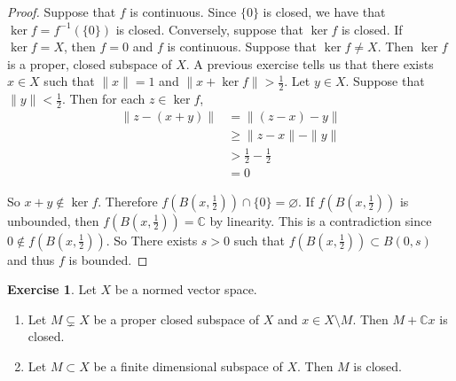\documentclass[12pt]{amsart}
\theoremstyle{definition}
\newtheorem{ex}[definition]{Exercise}
\newcommand{\C}{\mathbb{C}}
\begin{document}
	\begin{proof}
		Suppose that $f$ is continuous. Since $\{0\}$ is closed, we have that $\ker f = f^{-1}(\{0\})$ is closed. Conversely, suppose that $\ker f$ is closed. If $\ker f = X$, then $f =0$ and $f$ is continuous. Suppose that $\ker f \neq X$. Then $\ker f$ is a proper, closed subspace of $X$. A previous exercise tells us that there exists $x \in X$ such that $\|x \|= 1$ and $\|x + \ker f \|> \frac{1}{2}$. Let $y \in X$. Suppose that $\|y \|< \frac{1}{2}$. Then for each $z \in \ker f$, 
		\begin{align*}
			\|z -  (x+y)\|
			& = \|(z-x) -y \|\\
			& \geq \|z-x \|- \|y \|\\
			& > \frac{1}{2} - \frac{1}{2} \\
			&=0
		\end{align*}
		
		So $x+y \not \in \ker f$. Therefore $f(B(x,\frac{1}{2})) \cap \{0\} = \varnothing$. If $f(B(x,\frac{1}{2})) $ is unbounded, then $f(B(x,\frac{1}{2})) = \C$ by linearity. This is a contradiction since $0 \not \in f(B(x,\frac{1}{2}))$. So There exists $s > 0$ such that $f(B(x,\frac{1}{2})) \subset B(0,s)$ and thus $f$ is bounded. 
	\end{proof}
	
	\begin{ex}
		Let $X$ be a normed vector space. 
		\begin{enumerate}
			\item Let $M \subsetneq X$ be a proper closed subspace of $X$ and $x \in X \setminus M$. Then $M + \C x$ is closed.
			\item Let $M \subset X$ be a finite dimensional subspace of $X$. Then $M$ is closed.
		\end{enumerate}
	\end{ex}
	
\end{document}
